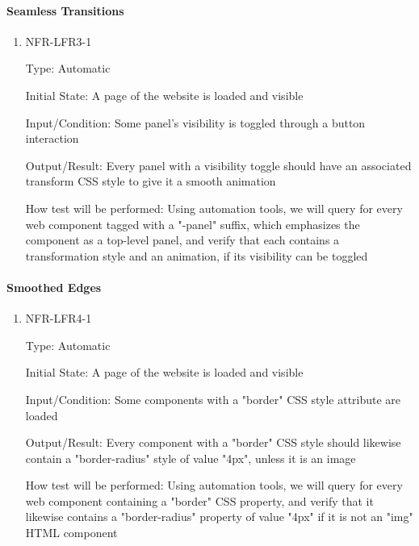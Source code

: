 \documentclass[12pt, titlepage]{article}
\begin{document}
\paragraph{Seamless Transitions}

\begin{enumerate}

\item{NFR-LFR3-1\\}

Type: Automatic
					
Initial State: A page of the website is loaded and visible
					
Input/Condition: Some panel's visibility is toggled through a button interaction
					
Output/Result: Every panel with a visibility toggle should have an associated transform CSS style to give it a smooth animation 
					
How test will be performed: Using automation tools, we will query for every web component tagged with a "-panel" suffix, which emphasizes the component as a top-level panel, and verify that each contains a transformation style and an animation, if its visibility can be toggled

\end{enumerate}

\paragraph{Smoothed Edges}

\begin{enumerate}

\item{NFR-LFR4-1\\}

Type: Automatic
					
Initial State: A page of the website is loaded and visible
					
Input/Condition: Some components with a "border" CSS style attribute are loaded
					
Output/Result: Every component with a "border" CSS style should likewise contain a "border-radius" style of value "4px", unless it is an image
					
How test will be performed: Using automation tools, we will query for every web component containing a "border" CSS property, and verify that it likewise contains a "border-radius" property of value "4px" if it is not an "img" HTML component

\end{enumerate}
\end{document}
